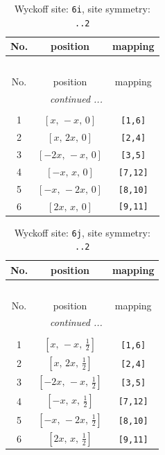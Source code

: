 \documentclass[fleqn,8pt]{jsarticle}
\begin{document}
\renewcommand{\arraystretch}{1.2}
\begin{longtable}{ccc}
\caption{Wyckoff site: {\tt 6i}, site symmetry: {\tt ..2}}
 \\
 \hline \hline
No. & position & mapping \\ \hline \endfirsthead

\multicolumn{2}{l}{\tablename\ \thetable{}} \\
 \hline \hline
No. & position & mapping \\ \hline \endhead

 \hline \hline
\multicolumn{2}{r}{\footnotesize\it continued ...} \\ \endfoot

 \hline \hline
\multicolumn{2}{r}{} \\ \endlastfoot

1 & $\left[ x,\, - x,\, 0 \right]$ & {\tt [1,6]} \\ \hline
2 & $\left[ x,\, 2 x,\, 0 \right]$ & {\tt [2,4]} \\ \hline
3 & $\left[ - 2 x,\, - x,\, 0 \right]$ & {\tt [3,5]} \\ \hline
4 & $\left[ - x,\, x,\, 0 \right]$ & {\tt [7,12]} \\ \hline
5 & $\left[ - x,\, - 2 x,\, 0 \right]$ & {\tt [8,10]} \\ \hline
6 & $\left[ 2 x,\, x,\, 0 \right]$ & {\tt [9,11]} \\
\end{longtable}
\renewcommand{\arraystretch}{1.2}
\begin{longtable}{ccc}
\caption{Wyckoff site: {\tt 6j}, site symmetry: {\tt ..2}}
 \\
 \hline \hline
No. & position & mapping \\ \hline \endfirsthead

\multicolumn{2}{l}{\tablename\ \thetable{}} \\
 \hline \hline
No. & position & mapping \\ \hline \endhead

 \hline \hline
\multicolumn{2}{r}{\footnotesize\it continued ...} \\ \endfoot

 \hline \hline
\multicolumn{2}{r}{} \\ \endlastfoot

1 & $\left[ x,\, - x,\, \frac{1}{2} \right]$ & {\tt [1,6]} \\ \hline
2 & $\left[ x,\, 2 x,\, \frac{1}{2} \right]$ & {\tt [2,4]} \\ \hline
3 & $\left[ - 2 x,\, - x,\, \frac{1}{2} \right]$ & {\tt [3,5]} \\ \hline
4 & $\left[ - x,\, x,\, \frac{1}{2} \right]$ & {\tt [7,12]} \\ \hline
5 & $\left[ - x,\, - 2 x,\, \frac{1}{2} \right]$ & {\tt [8,10]} \\ \hline
6 & $\left[ 2 x,\, x,\, \frac{1}{2} \right]$ & {\tt [9,11]} \\
\end{longtable}
\end{document}
